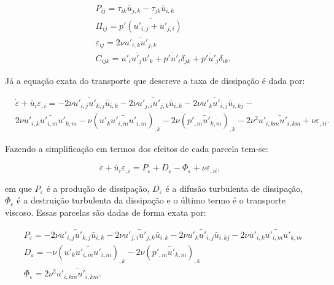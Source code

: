 \documentclass[_ArquivoPrincipal.tex]{subfiles}
\begin{document}
\begin{subequations}
    \begin{align}
         & P_{ij}=\tau_{ik}\bar{u}_{j,k}-\tau_{jk}\bar{u}_{i,k}                               \\
         & \Pi_{ij}=\bar{p'(u'_{i,j}+u'_{j,i})}                                               \\
         & \varepsilon_{ij}=2\nu\bar{u'_{i,k}u'_{j,k}}                                        \\
         & C_{ijk}=\bar{u'_iu'_ju'_k}+\bar{p'u'_i}\delta_{jk}+\bar{p'u'_j}\delta_{ik}\text{.}
    \end{align}
\end{subequations}

Já a equação exata do transporte que descreve a taxa de dissipação é dada por:

\begin{equation}
    \begin{split}
        &\dot{\varepsilon}+\bar{u}_i\varepsilon_{,i}=-2\nu\bar{u'_{i,j}u'_{k,j}}\bar{u}_{i,k}-2\nu\bar{u'_{j,i}u'_{j,k}}\bar{u}_{i,k}-2\nu\bar{u'_ku'_{i,j}}\bar{u}_{i,kj}-\\
        &2\nu\bar{u'_{i,k}u'_{i,m}u'_{k,m}}-\nu(\bar{u'_ku'_{i,m}u'_{i,m}})_{,k}-2\nu(\bar{p'_{,m}u'_{k,m}})_{,k}-2\nu^2\bar{u'_{i,km}u'_{i,km}}+\nu\varepsilon_{,ii}\text{.}
    \end{split}
\end{equation}

Fazendo a simplificação em termos dos efeitos de cada parcela tem-se:

\begin{equation}
    \dot{\varepsilon}+\bar{u}_i\varepsilon_{,i}=P_\varepsilon+D_\varepsilon-\Phi_\varepsilon+\nu\varepsilon_{,ii}\text{,}
\end{equation}

\noindent em que $P_\varepsilon$ é a produção de dissipação, $D_\varepsilon$ é a difusão turbulenta de dissipação, $\Phi_\varepsilon$ é a destruição turbulenta da dissipação e o último termo é o transporte viscoso. Essas parcelas são dadas de forma exata por:

\begin{subequations}
    \begin{align}
        &P_\varepsilon=-2\nu\bar{u'_{i,j}u'_{k,j}}\bar{u}_{i,k}-2\nu\bar{u'_{j,i}u'_{j,k}}\bar{u}_{i,k}-2\nu\bar{u'_ku'_{i,j}}\bar{u}_{i,kj}-2\nu\bar{u'_{i,k}u'_{i,m}u'_{k,m}}\\
        &D_\varepsilon=-\nu(\bar{u'_ku'_{i,m}u'_{i,m}})_{,k}-2\nu(\bar{p'_{,m}u'_{k,m}})_{,k}\\
        &\Phi_\varepsilon=2\nu^2\bar{u'_{i,km}u'_{i,km}}\text{.}
    \end{align}
\end{subequations}
\end{document}
